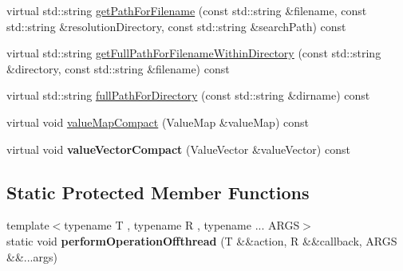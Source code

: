 \begin{DoxyCompactItemize}
\item 
virtual std\+::string \hyperlink{classFileUtils_a3e04619aee1bedf5915338f33a6fc4dc}{get\+Path\+For\+Filename} (const std\+::string \&filename, const std\+::string \&resolution\+Directory, const std\+::string \&search\+Path) const
\item 
virtual std\+::string \hyperlink{classFileUtils_aa6bae4977b0a23b40f5c4dfea7aee3ff}{get\+Full\+Path\+For\+Filename\+Within\+Directory} (const std\+::string \&directory, const std\+::string \&filename) const
\item 
virtual std\+::string \hyperlink{classFileUtils_a40bea93fd4b0929153b448c345dfcf8c}{full\+Path\+For\+Directory} (const std\+::string \&dirname) const
\item 
virtual void \hyperlink{classFileUtils_a5f6e7cc4108d8987fc652e99eb858d4c}{value\+Map\+Compact} (Value\+Map \&value\+Map) const
\item 
\mbox{\label{classFileUtils_a00022bbb58357022da0cd75c21d8b8df}} 
virtual void {\bfseries value\+Vector\+Compact} (Value\+Vector \&value\+Vector) const
\end{DoxyCompactItemize}
\subsection*{Static Protected Member Functions}
\begin{DoxyCompactItemize}
\item 
\mbox{\label{classFileUtils_a3cf9d8398d67cde31351eef5f7f31968}} 
{\footnotesize template$<$typename T , typename R , typename ... A\+R\+GS$>$ }\\static void {\bfseries perform\+Operation\+Offthread} (T \&\&action, R \&\&callback, A\+R\+GS \&\&...args)
\end{DoxyCompactItemize}
